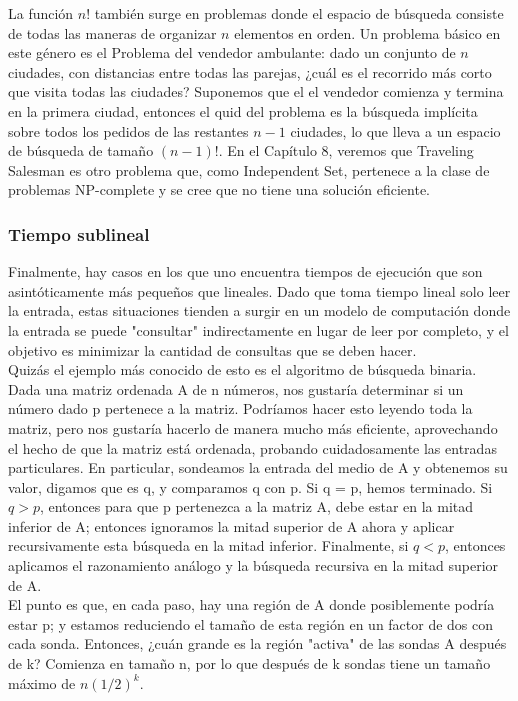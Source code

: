 \documentclass[a4paper, 12pt]{book}
\theoremstyle{dotless}
\begin{document}
La función $n!$ también surge en problemas donde el espacio de búsqueda consiste
de todas las maneras de organizar $n$ elementos en orden. Un problema básico en este género es el Problema del vendedor ambulante: dado un conjunto de $n$ ciudades, con distancias entre todas las parejas, ¿cuál es el recorrido más corto que visita todas las ciudades? Suponemos que el el vendedor comienza y termina en la primera ciudad, entonces el quid del problema es la búsqueda implícita sobre todos los pedidos de las restantes $n-1$ ciudades, lo que lleva a un espacio de búsqueda de tamaño $(n-1)!$. En el Capítulo 8, veremos que Traveling Salesman es otro problema que, como Independent Set, pertenece a la clase de problemas NP-complete y se cree que no tiene una solución
eficiente.\\

\subsubsection*{Tiempo sublineal}

Finalmente, hay casos en los que uno encuentra tiempos de ejecución que son asintóticamente más
pequeños que lineales. Dado que toma tiempo lineal solo leer la entrada, estas situaciones tienden a
surgir en un modelo de computación donde la entrada se puede "consultar" indirectamente en lugar de
leer por completo, y el objetivo es minimizar la cantidad de consultas que se deben hacer.\\

Quizás el ejemplo más conocido de esto es el algoritmo de búsqueda binaria. Dada una matriz
ordenada A de n números, nos gustaría determinar si un número dado p pertenece a la matriz.
Podríamos hacer esto leyendo toda la matriz, pero nos gustaría hacerlo de manera mucho más
eficiente, aprovechando el hecho de que la matriz está ordenada, probando cuidadosamente las
entradas particulares. En particular, sondeamos la entrada del medio de A y obtenemos su valor,
digamos que es q, y comparamos q con p. Si q = p, hemos terminado. Si $q>p$, entonces para que p
pertenezca a la matriz A, debe estar en la mitad inferior de A; entonces ignoramos la mitad superior de
A
ahora y aplicar recursivamente esta búsqueda en la mitad inferior. Finalmente, si $q<p$, entonces
aplicamos el razonamiento análogo y la búsqueda recursiva en la mitad superior de A.\\

El punto es que, en cada paso, hay una región de A donde posiblemente podría estar p; y
estamos reduciendo el tamaño de esta región en un factor de dos con cada sonda. Entonces, ¿cuán grande es la región "activa" de las sondas A después de k? Comienza en tamaño n, por lo que después de k sondas tiene un tamaño máximo de $n(1/2)^k$.\\
\end{document}
